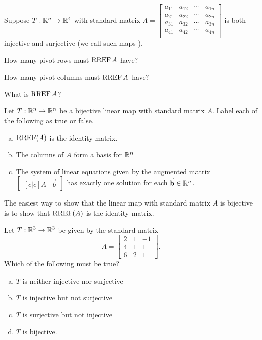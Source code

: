 \begin{activity}{5}
Suppose \(T: \mathbb{R}^n \rightarrow \mathbb{R}^4\) with standard matrix 
\(A=\begin{bmatrix}
  a_{11}&a_{12}&\cdots&a_{1n}\\
  a_{21}&a_{22}&\cdots&a_{2n}\\
  a_{31}&a_{32}&\cdots&a_{3n}\\
  a_{41}&a_{42}&\cdots&a_{4n}\\
\end{bmatrix}\) is both 
injective and surjective (we call such maps ).
\begin{subactivity}
How many pivot rows must \(\operatorname{RREF} A\) have?
\end{subactivity}
\begin{subactivity}
 How many pivot columns must \(\operatorname{RREF} A\) have?
\end{subactivity}
\begin{subactivity}
What is \(\operatorname{RREF} A\)?
\end{subactivity}
\end{activity}


\begin{activity}{5}
Let \(T: \mathbb{R}^n \rightarrow \mathbb{R}^n\) be a bijective linear map with
standard matrix \(A\). Label each of the following as true or false.
\begin{enumerate}[(a)]
\item \(\operatorname{RREF}(A)\) is the identity matrix.
\item The columns of \(A\) form a basis for \(\mathbb{R}^n\)
\item The system of linear equations given by the augmented matrix \(\begin{bmatrix}[c|c] A & \vec{b} \end{bmatrix}\) has exactly one solution
for each \(\mathbf{\accentset{\rightharpoonup}{b}} \in \mathbb{R}^n\).
\end{enumerate}
\end{activity}

\begin{observation}
  The easiest way to show that the linear map with standard matrix \(A\)
  is bijective is to show that \(\operatorname{RREF}(A)\) is the identity matrix.
\end{observation}

\begin{activity}{3}
Let \(T: \mathbb{R}^3 \rightarrow \mathbb{R}^3\) be given by the standard matrix \[A=\begin{bmatrix} 2&1&-1 \\ 4&1&1 \\ 6&2&1\end{bmatrix}.\] Which of the following must be true?
\begin{enumerate}[(a)]
\item \(T\) is neither injective nor surjective
\item \(T\) is injective but not surjective
\item \(T\) is surjective but not injective
\item \(T\) is bijective.
\end{enumerate}
\end{activity}

